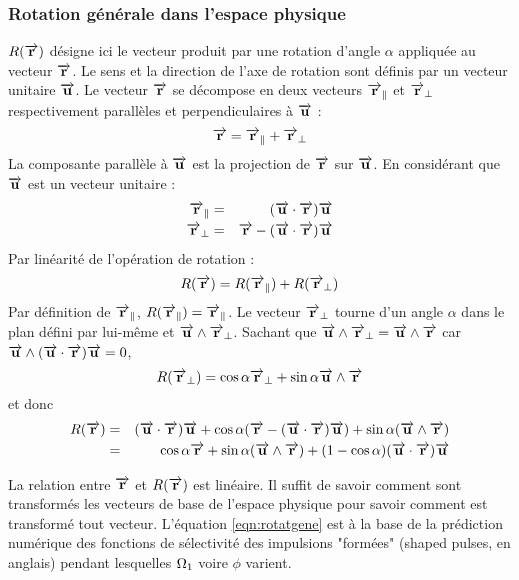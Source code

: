 \subsubsection{Rotation générale dans l'espace physique}
$R(\rvec)$ désigne ici le vecteur produit par une
rotation d'angle $\alpha$ appliquée au vecteur $\rvec$.
Le sens et la direction de l'axe de rotation sont définis 
par un vecteur unitaire $\uvec$.
Le vecteur $\rvec$ se décompose en deux vecteurs $\rvecpar$ et $\rvecper$
respectivement parallèles et perpendiculaires à $\uvec$ :
\begin{equation}
\rvec = \rvecpar + \rvecper
\end{equation}
La composante parallèle à $\uvec$ est la projection de $\rvec$ sur $\uvec$.
En considérant que $\uvec$ est un vecteur unitaire :
\begin{eqnarray}
\rvecpar & = & (\uvec \cdot \rvec)\uvec \\
\rvecper & = & \rvec - (\uvec \cdot \rvec)\uvec
\end{eqnarray}
Par linéarité de l'opération de rotation :
\begin{equation}
R(\rvec) = R(\rvecpar) + R(\rvecper)
\end{equation}
Par définition de $\rvecpar$, $R(\rvecpar) = \rvecpar$.
Le vecteur $\rvecper$ tourne d'un angle $\alpha$ dans le plan défini par
lui-même et $\uvec \wedge \rvecper$.
Sachant que $\uvec \wedge \rvecper = \uvec \wedge \rvec$
car $\uvec \wedge (\uvec \cdot \rvec)\uvec = 0$,
\begin{equation}
R(\rvecper) = \ca \rvecper + \sa \uvec \wedge \rvec
\end{equation}
et donc
\begin{eqnarray}
R(\rvec) & = & (\uvec \cdot \rvec)\uvec + \ca (\rvec -(\uvec \cdot \rvec)\uvec)
+ \sa (\uvec \wedge \rvec) \\
\label{eqn:rotatgene}
& = & \ca \rvec + \sa (\uvec \wedge \rvec) + (1 - \ca)(\uvec \cdot \rvec)\uvec
\end{eqnarray}

La relation entre $\rvec$ et $R(\rvec)$ est linéaire.
Il suffit de savoir comment sont transformés les vecteurs de base
de l'espace physique pour savoir comment est transformé tout vecteur.
L'équation \ref{eqn:rotatgene} est à la base de la prédiction numérique
des fonctions de sélectivité des impulsions "formées" (shaped pulses, en anglais)
pendant lesquelles $\omuns$ voire $\phi$ varient.
